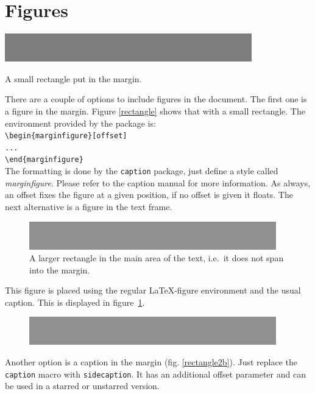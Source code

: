 \documentclass{caesar_book}
\begin{document}
\section{Figures}
%
\begin{marginfigure}%
    \includegraphics[width=\marginparwidth]{rectangle}%
    \caption{A small rectangle put in the margin.\label{rectangle}}%
\end{marginfigure}
%
There are a couple of options to include figures in the document. The first one is a figure in the margin. Figure \ref{rectangle} shows that with a small rectangle. The environment provided by the package is:\\
\verb+\begin{marginfigure}[offset]+\\
\verb+...+\\
\verb+\end{marginfigure}+\\
The formatting is done by the \texttt{caption} package, just define a style called \textit{marginfigure}. Please refer to the caption manual for more information. As always, an offset fixes the figure at a given position, if no offset is given it floats. The next alternative is a figure in the text frame. %
%
\begin{figure}[htbp]%
	\includegraphics[width=\textwidth]{rectangle2}%
	\caption{A larger rectangle in the main area of the text, i.e.\ it does not span into the margin.}%
	\label{rectangle2}%
\end{figure}%
%
This figure is placed using the regular \LaTeX-figure environment and the usual caption. This is displayed in figure~\ref{rectangle2}. 
%
\begin{figure}[htbp]%
	\includegraphics[width=\textwidth]{rectangle2}%
\end{figure}%
%
Another option is a caption in the margin (fig. \ref{rectangle2b}). Just replace the \texttt{caption} macro with \texttt{sidecaption}. It has an additional offset parameter and can be used in a starred or unstarred version.\\
\end{document}
